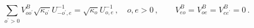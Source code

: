 \begin{equation}
\sum_{o^{\prime }>0}V_{oo^{\prime }}^{B}\sqrt{\kappa _{o^{\prime }}}%
U_{-o^{\prime },e}^{-1}=\sqrt{\kappa _{o}}U_{o,e}^{-1}\,,\quad
o,e>0\,,\qquad V_{eo}^{B}=V_{oe}^{B}=V_{ee^{\prime }}^{B}=0\,.
\label{eq:butterfly_VB}
\end{equation}

